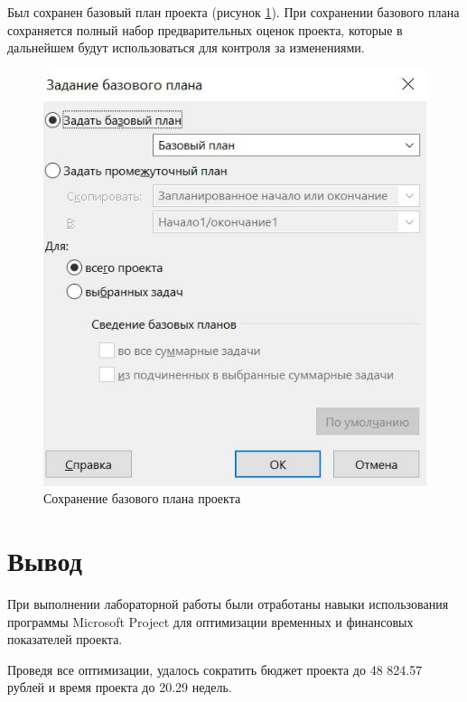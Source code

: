 Был сохранен базовый план проекта (рисунок \ref{img:task3-base}). При сохранении базового плана сохраняется полный набор предварительных оценок проекта, которые в дальнейшем будут использоваться для контроля за изменениями.

\begin{figure}[H]
	\begin{center}
		\includegraphics[scale=0.4]{inc/img/task3-base.jpg}
	\end{center}
	\captionsetup{justification=centering}
	\caption{Сохранение базового плана проекта}
	\label{img:task3-base}
\end{figure}

\section*{Вывод}

При выполнении лабораторной работы были отработаны навыки использования программы Microsoft Project для оптимизации временных и финансовых показателей проекта.

Проведя все оптимизации, удалось сократить бюджет проекта до 48 824.57 рублей и время проекта до 20.29 недель.
